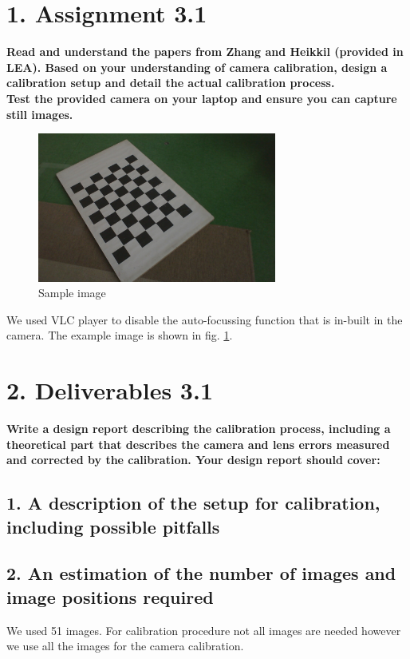 \section*{1. Assignment 3.1}
\textbf{Read and understand the papers from Zhang and Heikkil (provided in LEA). Based on your understanding of camera calibration, design a calibration setup and detail the actual calibration process. \\
Test the provided camera on your laptop and ensure you can capture still images.}

\begin{figure}[H]
\begin{center}
\includegraphics[width=0.7\textwidth]{data/1.jpg}
\caption{Sample image}
\label{fig:sample}
\end{center}
\end{figure}
We used VLC player to disable the auto-focussing function that is in-built in the camera. The example image is shown in fig. \ref{fig:sample}.

\section*{2. Deliverables 3.1}
\textbf{Write a design report describing the calibration process, including a theoretical part that describes the camera and lens errors measured and corrected by the calibration. Your design report should cover:}

\subsection*{1. A description of the setup for calibration, including possible pitfalls}

\subsection*{2. An estimation of the number of images and image positions required}
We used 51 images. For calibration procedure not all images are needed however we use all the images for the camera calibration.

